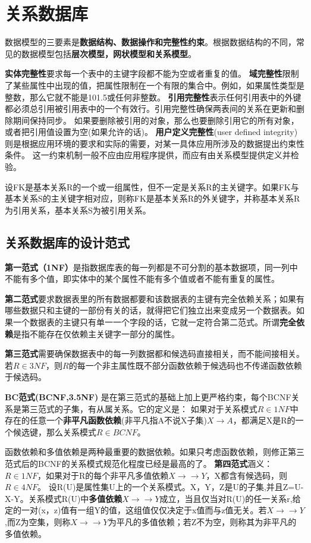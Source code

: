 \section{关系数据库}

数据模型的三要素是\textbf{数据结构、数据操作和完整性约束}。根据数据结构的不同，常见的数据模型包括\textbf{层次模型，网状模型和关系模型}。

\textbf{实体完整性}要求每一个表中的主键字段都不能为空或者重复的值。
\textbf{域完整性}限制了某些属性中出现的值，把属性限制在一个有限的集合中。例如，如果属性类型是整数，那么它就不能是101.5或任何非整数。
\textbf{引用完整性}表示任何引用表中的外键都必须总引用被引用表中的一个有效行。引用完整性确保两表间的关系在更新和删除期间保持同步。
如果要删除被引用的对象，那么也要删除引用它的所有对象，或者把引用值设置为空(如果允许的话)。
\textbf{用户定义完整性}(user defined integrity)则是根据应用环境的要求和实际的需要，对某一具体应用所涉及的数据提出约束性条件。
这一约束机制一般不应由应用程序提供，而应有由关系模型提供定义并检验。

设FK是基本关系R的一个或一组属性，但不一定是关系R的主关键字。如果FK与基本关系S的主关键字相对应，则称FK是基本关系R的外关键字，并称基本关系R为引用关系，基本关系S为被引用关系。

\subsection{关系数据库的设计范式}
\textbf{第一范式（1NF）}是指数据库表的每一列都是不可分割的基本数据项，同一列中不能有多个值，即实体中的某个属性不能有多个值或者不能有重复的属性。

\textbf{第二范式}要求数据表里的所有数据都要和该数据表的主键有完全依赖关系；如果有哪些数据只和主键的一部份有关的话，就得把它们独立出来变成另一个数据表。如果一个数据表的主键只有单一一个字段的话，它就一定符合第二范式。所谓\textbf{完全依赖}是指不能存在仅依赖主关键字一部分的属性。

\textbf{第三范式}需要确保数据表中的每一列数据都和候选码直接相关，而不能间接相关。
若$R \in 3NF$，则$R$的每一个非主属性既不部分函数依赖于候选码也不传递函数依赖于候选码。

\textbf{BC范式(BCNF,3.5NF)}
是在第三范式的基础上加上更严格约束，每个BCNF关系是第三范式的子集，有从属关系。它的定义是：
如果对于关系模式$R \in 1NF$中存在的任意一个\textbf{非平凡函数依赖}(非平凡指A不说X子集)$X \to A$，都满足X是R的一个候选键，那么关系模式$R \in BCNF$。

函数依赖和多值依赖是两种最重要的数据依赖。如果只考虑函数依赖，则修正第三范式后的BCNF的关系模式规范化程度已经是最高的了。
\textbf{第四范式}涵义：$R \in 1NF$，如果对于R的每个非平凡多值依赖$X \to \to Y$，X都含有候选码，则$R \in 4NF$。
设R(U)是属性集U上的一个关系模式。X，Y，Z是U的子集,并且Z=U-X-Y。关系模式R(U)中\textbf{多值依赖}$X \to \to Y$成立，当且仅当对R(U)的任一关系r,给定的一对(x，z)值有一组Y的值，这组值仅仅决定于x值而与z值无关。若$X \to \to Y$,而Z为空集，则称$X \to \to Y$为平凡的多值依赖；若Z不为空，则称其为非平凡的多值依赖。



